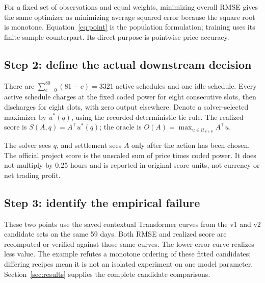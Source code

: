 \documentclass[11pt,a4paper]{article}
\begin{document}
For a fixed set of observations and equal weights, minimizing overall RMSE gives the same optimizer as minimizing average squared error because the square root is monotone. Equation~\eqref{eq:point} is the population formulation; training uses its finite-sample counterpart. Its direct purpose is pointwise price accuracy.

\subsection{Step 2: define the actual downstream decision}
\EqDispatch
There are $\sum_{c=0}^{80}(81-c)=3321$ active schedules and one idle schedule. Every active schedule charges at the fixed coded power for eight consecutive slots, then discharges for eight slots, with zero output elsewhere. Denote a solver-selected maximizer by $u^*(q)$, using the recorded deterministic tie rule. The realized score is $S(A,q)=A^\top u^*(q)$; the oracle is $O(A)=\max_{u\in\mathcal U_{8+8}}A^\top u$.

The solver sees $q$, and settlement sees $A$ only after the action has been chosen. The official project score is the unscaled sum of price times coded power. It does not multiply by 0.25 hours and is reported in original score units, not currency or net trading profit.

\subsection{Step 3: identify the empirical failure}
\EqFailure
These two points use the saved contextual Transformer curves from the v1 and v2 candidate sets on the same 59 days. Both RMSE and realized score are recomputed or verified against those same curves. The lower-error curve realizes less value. The example refutes a monotone ordering of these fitted candidates; differing recipes mean it is not an isolated experiment on one model parameter. Section~\ref{sec:results} supplies the complete candidate comparisons.
\end{document}
